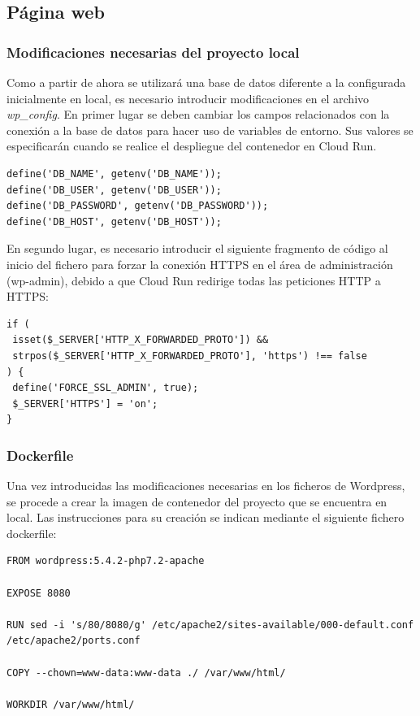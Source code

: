 \subsection{Página web}

\subsubsection{Modificaciones necesarias del proyecto local}

Como a partir de ahora se utilizará una base de datos diferente a la configurada inicialmente en local, es necesario introducir modificaciones en el archivo \textit{wp\_config}. En primer lugar se deben cambiar los campos relacionados con la conexión a la base de datos para hacer uso de variables de entorno. Sus valores se especificarán cuando se realice el despliegue del contenedor en Cloud Run.

\newpage 

\begin{lstlisting}[caption= Variables de entorno wp-config.php]
define('DB_NAME', getenv('DB_NAME'));
define('DB_USER', getenv('DB_USER'));
define('DB_PASSWORD', getenv('DB_PASSWORD'));
define('DB_HOST', getenv('DB_HOST'));
\end{lstlisting}

En segundo lugar, es necesario introducir el siguiente fragmento de código al inicio del fichero para forzar la conexión HTTPS en el área de administración (wp-admin), debido a que Cloud Run redirige todas las peticiones HTTP a HTTPS:

\begin{lstlisting}[caption= Forzar conexi\'on https]
if (
 isset($_SERVER['HTTP_X_FORWARDED_PROTO']) &&
 strpos($_SERVER['HTTP_X_FORWARDED_PROTO'], 'https') !== false
) {
 define('FORCE_SSL_ADMIN', true);
 $_SERVER['HTTPS'] = 'on';
}
\end{lstlisting}

\subsubsection{Dockerfile}

Una vez introducidas las modificaciones necesarias en los ficheros de Wordpress, se procede a crear la imagen de contenedor del proyecto que se encuentra en local. Las instrucciones para su creación se indican mediante el siguiente fichero dockerfile:

\begin{lstlisting}[caption= Dockerfile de Wordpress]
FROM wordpress:5.4.2-php7.2-apache

EXPOSE 8080

RUN sed -i 's/80/8080/g' /etc/apache2/sites-available/000-default.conf /etc/apache2/ports.conf

COPY --chown=www-data:www-data ./ /var/www/html/

WORKDIR /var/www/html/
\end{lstlisting}
 
